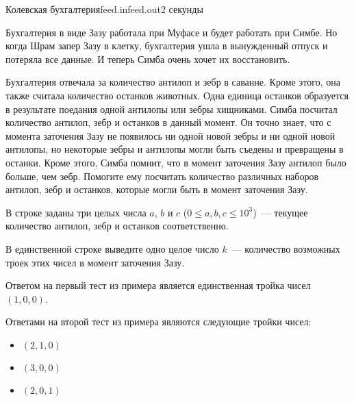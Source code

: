 \begin{problem}{Колевская бухгалтерия}{feed.in}{feed.out}{2 секунды}{}


Бухгалтерия в виде Зазу работала при Муфасе и будет работать при Симбе. Но когда Шрам запер Зазу в клетку,
бухгалтерия ушла в вынужденный отпуск и потеряла все данные. И теперь Симба очень хочет их восстановить.

Бухгалтерия отвечала за количество антилоп и зебр в саванне. Кроме этого, она также считала количество останков животных. 
Одна единица останков образуется в результате поедания одной антилопы или зебры хищниками. Симба посчитал количество антилоп, 
зебр и останков в данный момент. Он точно знает, что с момента заточения Зазу не появилось ни одной новой зебры и ни одной новой 
антилопы, но некоторые зебры и антилопы могли быть съедены и превращены в останки. Кроме этого, Симба помнит, что в момент заточения 
Зазу антилоп было больше, чем зебр. Помогите ему посчитать количество различных наборов антилоп, зебр и останков, которые могли 
быть в момент заточения Зазу.

\InputFile
В строке заданы три целых числа $a$, $b$ и $c$ ($0 \le a, b, c \le 10^3$)~--- текущее количество антилоп, зебр и останков 
соответственно.

\OutputFile
В единственной строке выведите одно целое число $k$~--- количество возможных троек этих чисел в момент заточения Зазу.

\Examples
\begin{example}%
%
%
\end{example}

\Note
Ответом на первый тест из примера является единственная тройка чисел $(1, 0, 0)$.

Ответами на второй тест из примера являются следующие тройки чисел:
\begin{itemize}
\item$(2, 1, 0)$
\item$(3, 0, 0)$
\item$(2, 0, 1)$
\end{itemize}

\end{problem}
